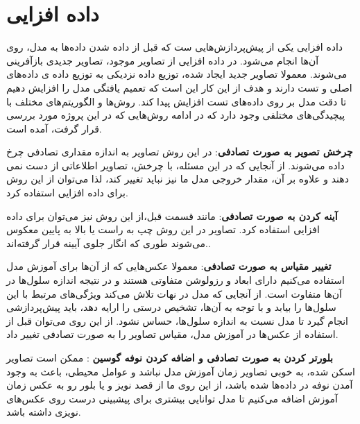 \section{داده افزایی}\label{subsec:داده-افزایی}

داده افزایی یکی از پیش‌پردازش‌هایی ست که قبل از داده شدن داده‌ها به مدل، روی آن‌ها انجام می‌شود.
در داده افزایی از تصاویر موجود، تصاویر جدیدی بازآفرینی می‌شوند.
معمولا تصاویر جدید ایجاد شده، توزیع داده نزدیکی به توزیع داده ی داده‌های اصلی و تست دارند و هدف از این کار این است که تعمیم یافتگی مدل را افزایش دهیم تا دقت مدل بر روی داده‌های تست افزایش پیدا کند.
روش‌ها و الگوریتم‌های مختلف با پیچیدگی‌های مختلفی وجود دارد که در ادامه روش‌هایی که در این پروژه مورد بررسی قرار گرفت، آمده است.

\textbf{چرخش تصویر به صورت تصادفی}:
در این روش تصاویر به اندازه مقداری تصادفی چرخ داده می‌شوند.
از آنجایی که در این مسئله، با چرخش، تصاویر اطلاعاتی از دست نمی دهند و علاوه بر آن، مقدار خروجی مدل ما نیز نباید تغییر کند، لذا می‌توان از این روش برای داده افزایی استفاده کرد.

\textbf{آینه کردن به صورت تصادفی}:
مانند قسمت قبل،از این روش نیز می‌توان برای داده افزایی استفاده کرد. تصاویر در این روش چپ به راست یا بالا به پایین معکوس می‌شوند طوری که انگار جلوی آیینه قرار گرفته‌اند..

\textbf{تغییر مقیاس به صورت تصادفی}:
معمولا عکس‌هایی که از آن‌ها برای آموزش مدل استفاده می‌کنیم دارای ابعاد و رزولوشن متفاوتی هستند و در نتیجه اندازه سلول‌ها در آن‌ها متفاوت است.
از آنجایی که مدل در نهات تلاش می‌کند ویژگی‌های مرتبط با این سلول‌ها را بیابد و با توجه به آن‌ها، تشخیص درستی را ارایه دهد، باید پیش‌پردازشی انجام گیرد تا مدل نسبت به اندازه سلول‌ها، حساس نشود. از این روی می‌توان قبل از استفاده از عکس‌ها در آموزش مدل، مقیاس تصاویر را به صورت تصادفی تغییر داد.

\textbf{بلورتر کردن به صورت تصادفی و اضافه کردن نوفه گوسین }:
ممکن است تصاویر اسکن شده، به خوبی تصاویر زمان آموزش مدل نباشد و عوامل محیطی، باعث به وجود آمدن نوفه در داده‌ها شده باشد، از این روی ما از قصد نویز و یا بلور رو به عکس زمان آموزش اضافه می‌کنیم تا مدل توانایی بیشتری برای پیشبینی درست روی عکس‌های نویزی داشته باشد.

